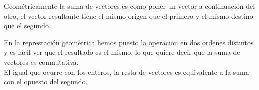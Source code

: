 \documentclass[a4paper,11pt,answers]{exam}
\begin{document}
Geométricamente la suma de vectores es como poner un vector a continuación del otro, el vector
resultante tiene el mismo origen que el primero y el mismo destino que el segundo.
\begin{center}
  \begin{multicols}{2}
    
  \end{multicols}
\end{center}

En la represtación geométrica hemos puesto la operación en dos ordenes distintos y es fácil ver
que el resultado es el mismo, lo que quiere decir que la suma de vectores es conmutativa.\\

El igual que ocurre con los enteros, la resta de vectores es equivalente a la suma con el
opuesto del segundo.
\end{document}
